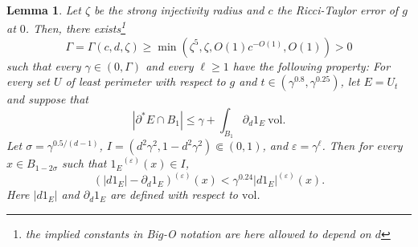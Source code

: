 \documentclass[reqno,12pt,letterpaper]{amsart}
\newcommand{\vol}{\mathrm{vol}}
\newtheorem{lemma}[theorem]{Lemma}
\theoremstyle{definition}
\numberwithin{equation}{section}
\begin{document}
\begin{lemma}\label{big mollify}
Let $\zeta$ be the strong injectivity radius and $c$ the Ricci-Taylor error of $g$ at $0$.
Then, there exists\footnote{the implied constants in Big-O notation are here allowed to depend on $d$}
\begin{equation}\label{estimates on Gamma}
\Gamma = \Gamma(c, d, \zeta) \geq \min(\zeta^5, \zeta, O(1)c^{-O(1)}, O(1)) > 0
\end{equation}
such that every $\gamma \in (0, \Gamma)$ and every $\ell \geq 1$ have the following property:
For every set $U$ of least perimeter with respect to $g$ and $t \in (\gamma^{0.8}, \gamma^{0.25})$, let $E = U_t$ and suppose that
\begin{equation}\label{hypothesis on Giusti73}
|\partial^* E \cap B_1| \leq \gamma + \int_{B_1} \partial_d 1_E~\vol.
\end{equation}
Let $\sigma = \gamma^{0.5/(d-1)}$, $I = (d^2 \gamma^2, 1 - d^2\gamma^2) \Subset (0, 1)$, and $\varepsilon = \gamma^\ell$.
Then for every $x \in B_{1 - 2\sigma}$ such that ${1_E}^{(\varepsilon)}(x) \in I$,
$$(|d1_E| - \partial_d 1_E)^{(\varepsilon)}(x) < \gamma^{0.24} |d1_E|^{(\varepsilon)}(x).$$
Here $|d1_E|$ and $\partial_d 1_E$ are defined with respect to $\vol$.
\end{lemma}
\end{document}
